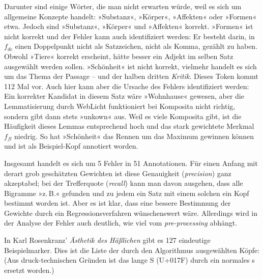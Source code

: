 \documentclass{article}
\newcommand*{\lit}{\textit}%
\newcommand*{\englisch}[1]{\foreignlanguage{english}{\textit{#1}}}%
\begin{document}
Darunter sind einige Wörter, die man nicht erwarten würde, weil es
sich um allgemeine Konzepte handelt: »Substanz«, »Körper«, »Affekten«
oder »Formen« etwa. Jedoch sind »Substanz«, »Körper« und »Affekten«
korrekt. »Formen« ist nicht korrekt und der Fehler kann auch
identifiziert werden: Er besteht darin, in $f_{dc}$ einen Doppelpunkt
nicht als Satzzeichen, nicht als Komma, gezählt zu haben. Obwohl
»Tiere« korrekt erscheint, hätte besser ein Adjekt im selben Satz
ausgewählt werden sollen. »Schönheit« ist nicht korrekt, vielmehr
handelt es sich um das Thema der Passage -- und der halben dritten
\lit{Kritik}. Dieses Token kommt 112 Mal vor. Auch hier kann aber die
Ursache des Fehlers identifiziert werden: Ein korrekter Kandidat in
diesem Satz wäre »Wohnhause« gewesen, aber die Lemmatisierung durch
WebLicht funktioniert bei Komposita nicht richtig, sondern gibt dann
stets »unkown« aus. Weil es viele Komposita gibt, ist die Häufigkeit
dieses Lemmas entsprechend hoch und das stark gewichtete Merkmal
$f_{fl}$ niedrig. So hat »Schönheit« das Rennen um das Maximum
gewinnen können und ist als Beispiel-Kopf annotiert worden.

Insgesamt handelt es sich um 5 Fehler in 51 Annotationen. Für einen
Anfang mit derart grob geschätzten Gewichten ist diese Genauigkeit
(\englisch{precision}) ganz akzeptabel; bei der Trefferquote
(\englisch{recall}) kann man davon ausgehen, dass alle Bigramme
»z.\,B.« gefunden und zu jedem ein Satz mit einem solchen ein Kopf
bestimmt worden ist. Aber es ist klar, dass eine bessere Bestimmung
der Gewichte durch ein Regressionsverfahren wünschenswert
wäre. Allerdings wird in der Analyse der Fehler auch deutlich, wie
viel vom \englisch{pre-processing} abhängt.


In Karl Rosenkranz' \lit{Ästhetik des
  Häßlichen} \parencite{Rosenkranz1853a} gibt es 127 eindeutige
Beispielmarker. Dies ist die Liste der durch den Algorithmus
ausgewählten Köpfe: (Aus druck-technischen Gründen ist das lange S
(U+017F) durch ein normales s ersetzt worden.)
\end{document}
